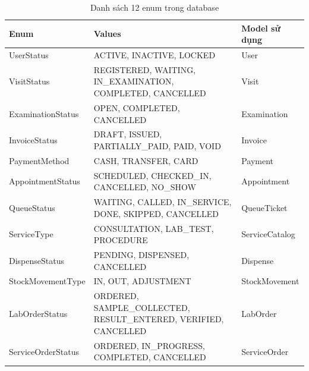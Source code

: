 \begin{longtable}{|p{4cm}|p{8cm}|p{3cm}|}
\caption{Danh sách 12 enum trong database}\\
\hline
\textbf{Enum} & \textbf{Values} & \textbf{Model sử dụng} \\
\hline
UserStatus & ACTIVE, INACTIVE, LOCKED & User \\
\hline
VisitStatus & REGISTERED, WAITING, IN\_EXAMINATION, COMPLETED, CANCELLED & Visit \\
\hline
ExaminationStatus & OPEN, COMPLETED, CANCELLED & Examination \\
\hline
InvoiceStatus & DRAFT, ISSUED, PARTIALLY\_PAID, PAID, VOID & Invoice \\
\hline
PaymentMethod & CASH, TRANSFER, CARD & Payment \\
\hline
AppointmentStatus & SCHEDULED, CHECKED\_IN, CANCELLED, NO\_SHOW & Appointment \\
\hline
QueueStatus & WAITING, CALLED, IN\_SERVICE, DONE, SKIPPED, CANCELLED & QueueTicket \\
\hline
ServiceType & CONSULTATION, LAB\_TEST, PROCEDURE & ServiceCatalog \\
\hline
DispenseStatus & PENDING, DISPENSED, CANCELLED & Dispense \\
\hline
StockMovementType & IN, OUT, ADJUSTMENT & StockMovement \\
\hline
LabOrderStatus & ORDERED, SAMPLE\_COLLECTED, RESULT\_ENTERED, VERIFIED, CANCELLED & LabOrder \\
\hline
ServiceOrderStatus & ORDERED, IN\_PROGRESS, COMPLETED, CANCELLED & ServiceOrder \\
\hline
\end{longtable}


